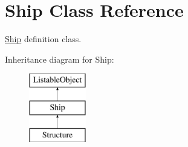 \hypertarget{class_ship}{}\section{Ship Class Reference}
\label{class_ship}


\hyperlink{class_ship}{Ship} definition class.  


Inheritance diagram for Ship\+:\begin{figure}[H]
\begin{center}
\leavevmode
\includegraphics[height=3.000000cm]{class_ship}
\end{center}
\end{figure}
